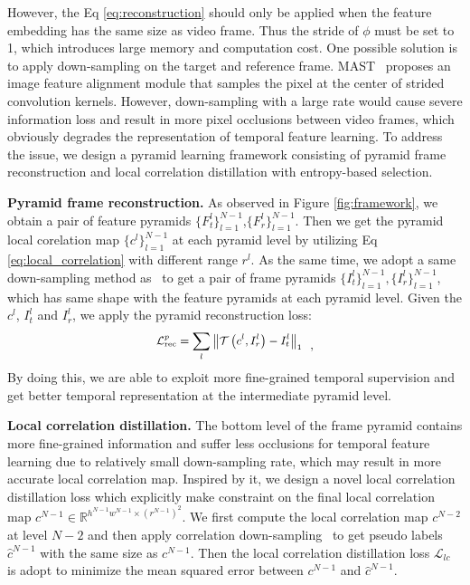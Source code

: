 \documentclass{article}
\begin{document}
However, the Eq \ref{eq:reconstruction} should only be applied when the feature embedding has the same size as video frame. Thus the stride of $\phi$ must be set to 1, which introduces large memory and computation cost. One possible solution is to apply down-sampling on the target and reference frame. MAST~\cite{lai2020mast} proposes an image feature alignment module that samples the pixel at the center of strided convolution kernels. However, down-sampling with a large rate would cause severe information loss and result in more pixel occlusions between video frames, which obviously degrades the representation of temporal feature learning. To address the issue, we design a pyramid learning framework consisting of pyramid frame reconstruction and local correlation distillation with entropy-based selection.

\textbf{Pyramid frame reconstruction.}  As observed in Figure \ref{fig:framework}, we obtain a pair of feature pyramids $\{F^l_t\}^{N-1}_{l=1}$,$\{F^l_{r}\}^{N-1}_{l=1}$.  Then we get the pyramid local corelation map $\{c^l\}^{N-1}_{l=1}$ at each pyramid level by utilizing Eq \ref{eq:local_correlation} with different range $r^l$. As the same time, we adopt a same down-sampling method as~\cite{lai2020mast} to get a pair of frame pyramids $\{I^l_t\}^{N-1}_{l=1},\{I^l_{r}\}^{N-1}_{l=1}$, which has same shape with the feature pyramids at each pyramid level. Given the $c^l$, $I^l_t$ and $I^l_r$, we apply the pyramid reconstruction loss:
\begin{equation}\label{eq:pyramid reconstruction loss}
  \small
  \begin{aligned}
    \mathcal{L}^{p}_{\mathrm{rec}}=\sum_l\left\|\mathcal{T}\left(c^l, I^l_r\right) - I^l_{t}\right\|_{1}
  \end{aligned}~~,
\end{equation}
By doing this, we are able to exploit more fine-grained temporal supervision and get better temporal representation at the intermediate pyramid level. 

\textbf{Local correlation distillation.} The bottom level of the frame pyramid contains more fine-grained information and suffer less occlusions for temporal feature learning due to relatively small down-sampling rate, which may result in more accurate local correlation map. Inspired by it, we design a novel local correlation distillation loss which explicitly make constraint on the final local correlation map $c^{N-1} \in \mathbb{R}^{h^{N-1}w^{N-1} \times (r^{N-1})^2}$. We first compute the local correlation map $c^{N-2}$ at level $N-2$ and then apply  correlation down-sampling~\cite{teed2020raft} to get pseudo labels $\hat{c}^{N-1}$ with the same size as $c^{N-1}$.  Then the local correlation distillation loss $\mathcal{L}_{lc}$ is adopt to minimize the mean squared error between $c^{N-1}$ and $\hat{c}^{N-1}$.\\
\end{document}
